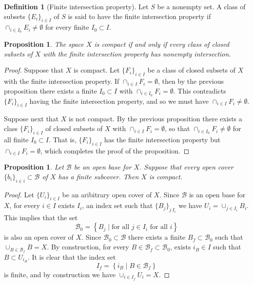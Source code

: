\documentclass[11pt,a4paper]{article}
\theoremstyle{definition}
\newtheorem{definition}{Definition}[section]
\theoremstyle{plain}
\newtheorem{proposition}[theorem]{Proposition}
\newcommand{\set}[2]{ \left\{ #1 \mid #2 \right\} }
\begin{document}
  \begin{definition}[Finite intersection property]
    Let $S$ be a nonempty set. A class of subsets $\{E_i\}_{i \in I}$ of 
    $S$ is said to have the finite intersection property if 
    $\cap_{i \in I_0}{E_i} \neq \emptyset$ for every finite 
    $I_0 \subset I$.
  \end{definition}

  \begin{proposition}
    The space $X$ is compact if and only if every class of closed
    subsets of $X$ with the finite intersection property has nonempty 
    intersection.
  \end{proposition}
  \begin{proof}
    Suppose that $X$ is compact. Let $\{F_i\}_{i \in I}$ be a class of closed 
    subsets of $X$ with the finite intersection property. 
    If $\cap_{i \in I} F_i = \emptyset$, then by the previous proposition
    there exists a finite $I_0 \subset I$ with 
    $\cap_{i \in I_0} F_i = \emptyset$. 
    This contradicts $\{F_i\}_{i \in I}$ having the finite intersection 
    property, and so we must have $\cap_{i \in I} F_i \neq \emptyset$.

    Suppose next that $X$ is not compact. By the previous proposition there 
    exists a class $\{F_i\}_{i \in I}$ of closed subsets of $X$ 
    with $\cap_{i \in I} F_i = \emptyset$,
    so that $\cap_{i \in I_0} F_i \neq \emptyset$ for all finite
    $I_0 \subset I$. That is, $\{F_i\}_{i \in I}$ has the finite intersection 
    property but $\cap_{i \in I} F_i = \emptyset$, 
    which completes the proof of the proposition.
  \end{proof}

  \begin{proposition}
    Let $\mathcal B$ be an open base for $X$. Suppose that every open cover
    $\{b_i\}_{i \in i} \subset \mathcal B$ of $X$ has a finite subcover. 
    Then $X$ is compact.
  \end{proposition}
  \begin{proof}
    Let $\{U_i\}_{i \in I}$ be an aribitrary open cover of $X$. Since
    $\mathcal B$ is an open base for $X$, for every $i \in I$ exists
    $I_i$, an index set such that $\{B_j\}_{j \ I_i}$ we have
    $U_i = \cup_{j \in I_i} B_i$. This implies that the set
    \[
      \mathcal B_0 = \set{B_j}{\text{for all $j \in I_i$ for all $i$}}
    \]
    is also an open cover of $X$. Since $\mathcal B_0 \subset \mathcal B$
    there exists a finite $B_f \subset \mathcal B_0$ such that
    $\cup_{B \in \mathcal B_f} B = X$. By construction, for every
    $B \in \mathcal B_f \subset \mathcal B_0$, exists $i_B \in I$ such
    that $B \subset U_{i_B}$. It is clear that the index set
    \[
      I_f = \set{i_B}{B \in \mathcal B_f}
    \]
    is finite, and by construction we have $\cup_{i \in I_f} U_i = X$.
  \end{proof}
\end{document}
